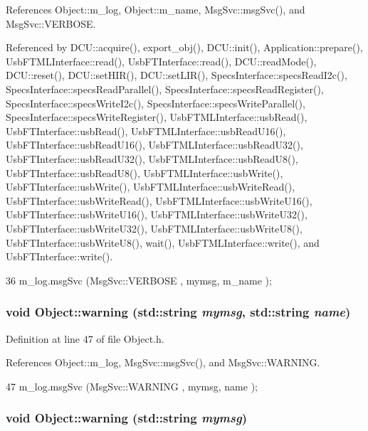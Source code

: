References Object::m\_\-log, Object::m\_\-name, MsgSvc::msgSvc(), and MsgSvc::VERBOSE.

Referenced by DCU::acquire(), export\_\-obj(), DCU::init(), Application::prepare(), UsbFTMLInterface::read(), UsbFTInterface::read(), DCU::readMode(), DCU::reset(), DCU::setHIR(), DCU::setLIR(), SpecsInterface::specsReadI2c(), SpecsInterface::specsReadParallel(), SpecsInterface::specsReadRegister(), SpecsInterface::specsWriteI2c(), SpecsInterface::specsWriteParallel(), SpecsInterface::specsWriteRegister(), UsbFTMLInterface::usbRead(), UsbFTInterface::usbRead(), UsbFTMLInterface::usbReadU16(), UsbFTInterface::usbReadU16(), UsbFTMLInterface::usbReadU32(), UsbFTInterface::usbReadU32(), UsbFTMLInterface::usbReadU8(), UsbFTInterface::usbReadU8(), UsbFTMLInterface::usbWrite(), UsbFTInterface::usbWrite(), UsbFTMLInterface::usbWriteRead(), UsbFTInterface::usbWriteRead(), UsbFTMLInterface::usbWriteU16(), UsbFTInterface::usbWriteU16(), UsbFTMLInterface::usbWriteU32(), UsbFTInterface::usbWriteU32(), UsbFTMLInterface::usbWriteU8(), UsbFTInterface::usbWriteU8(), wait(), UsbFTMLInterface::write(), and UsbFTInterface::write().


\begin{DoxyCode}
36 { m_log.msgSvc (MsgSvc::VERBOSE , mymsg, m_name ); }
\end{DoxyCode}
\hypertarget{classObject_a11f101db4dd73d9391b0231818881d86}{
\subsubsection[{warning}]{\setlength{\rightskip}{0pt plus 5cm}void Object::warning (std::string {\em mymsg}, \/  std::string {\em name})}}
\label{classObject_a11f101db4dd73d9391b0231818881d86}


Definition at line 47 of file Object.h.

References Object::m\_\-log, MsgSvc::msgSvc(), and MsgSvc::WARNING.


\begin{DoxyCode}
47 { m_log.msgSvc (MsgSvc::WARNING , mymsg, name ); }
\end{DoxyCode}
\hypertarget{classObject_a65cd4fda577711660821fd2cd5a3b4c9}{
\subsubsection[{warning}]{\setlength{\rightskip}{0pt plus 5cm}void Object::warning (std::string {\em mymsg})}}
\label{classObject_a65cd4fda577711660821fd2cd5a3b4c9}


